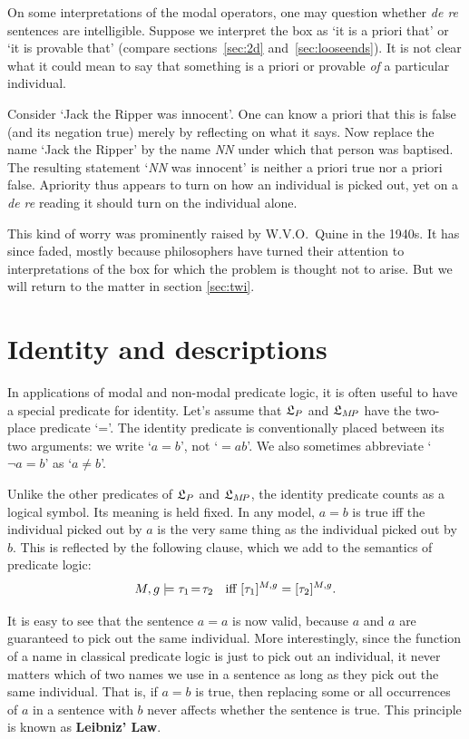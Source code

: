 On some interpretations of the modal operators, one may question whether
\emph{de re} sentences are intelligible. Suppose we interpret the box as `it is
a priori that' or `it is provable that' (compare sections~\ref{sec:2d}
and~\ref{sec:looseends}). It is not clear what it could mean to say that
something is a priori or provable \emph{of} a particular individual.

Consider `Jack the Ripper was innocent'. One can know a priori that this is
false (and its negation true) merely by reflecting on what it says. Now replace
the name `Jack the Ripper' by the name \emph{NN} under which that person was
baptised. The resulting statement `\emph{NN} was innocent' is neither a priori
true nor a priori false. Apriority thus appears to turn on how an individual is
picked out, yet on a \emph{de re} reading it should turn on the individual
alone.

This kind of worry was prominently raised by W.V.O.\ Quine in the 1940s. It has
since faded, mostly because philosophers have turned their attention to
interpretations of the box for which the problem is thought not to arise. But we
will return to the matter in section \ref{sec:twi}.


\section{Identity and descriptions}
\label{sec:identity}

In applications of modal and non-modal predicate logic, it is often useful to
have a special predicate for identity. Let's assume that $\mathfrak{L}_P$ and $\mathfrak{L}_{M\!P}$
have the two-place predicate `='. The identity predicate is conventionally
placed between its two arguments: we write `$a=b$', not `$=\!ab$'. We also sometimes abbreviate `$\neg a\!=\!b$' as `$a\not=b$'. 

Unlike the other predicates of $\mathfrak{L}_P$ and $\mathfrak{L}_{M\!P}$, the identity predicate
counts as a logical symbol. Its meaning is held fixed. In any model, $a=b$
is true iff the individual picked out by $a$ is the very same thing as the
individual picked out by $b$. This is reflected by the following clause, which
we add to the semantics of predicate logic:
\[
  M,g \models \tau_1\!=\!\tau_2\text{ \; iff }[\tau_1]^{M,g} = [\tau_2]^{M,g}.
\]

It is easy to see that the sentence $a=a$ is now valid, because $a$ and $a$ are
guaranteed to pick out the same individual. More interestingly, since the
function of a name in classical predicate logic is just to pick out an
individual, it never matters which of two names we use in a sentence as long as they pick out the same
individual. That is, if $a=b$ is true, then replacing some or all occurrences of
$a$ in a sentence with $b$ never affects whether the sentence is true. This
principle is known as \textbf{Leibniz' Law}.


